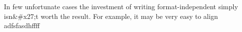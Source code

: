 
In few unfortunate cases the investment of writing format-independent \latex simply isn&#x27;t worth the result. For example, it may be very easy to align adfsfasdhffff